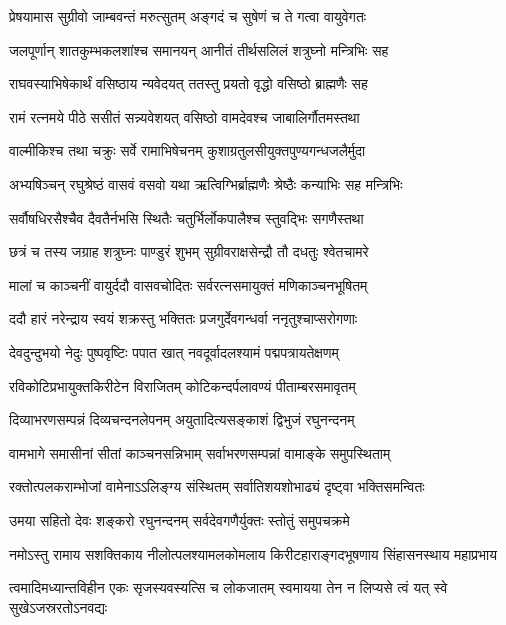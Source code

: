 \twolineshloka
{प्रेषयामास सुग्रीवो जाम्बवन्तं मरुत्सुतम्}
{अङ्गदं च सुषेणं च ते गत्वा वायुवेगतः} %

\twolineshloka
{जलपूर्णान् शातकुम्भकलशांश्च समानयन्}
{आनीतं तीर्थसलिलं शत्रुघ्नो मन्त्रिभिः सह} %

\twolineshloka
{राघवस्याभिषेकार्थं वसिष्ठाय न्यवेदयत्}
{ततस्तु प्रयतो वृद्धो वसिष्ठो ब्राह्मणैः सह} %

\twolineshloka
{रामं रत्नमये पीठे ससीतं सन्न्यवेशयत्}
{वसिष्ठो वामदेवश्च जाबालिर्गौतमस्तथा} %

\twolineshloka
{वाल्मीकिश्च तथा चक्रुः सर्वे रामाभिषेचनम्}
{कुशाग्रतुलसीयुक्तपुण्यगन्धजलैर्मुदा} %

\twolineshloka
{अभ्यषिञ्चन् रघुश्रेष्ठं वासवं वसवो यथा}
{ऋत्विग्भिर्ब्राह्मणैः श्रेष्ठैः कन्याभिः सह मन्त्रिभिः} %

\twolineshloka
{सर्वौषधिरसैश्चैव दैवतैर्नभसि स्थितैः}
{चतुर्भिर्लोकपालैश्च स्तुवद्भिः सगणैस्तथा} %

\twolineshloka
{छत्रं च तस्य जग्राह शत्रुघ्नः पाण्डुरं शुभम्}
{सुग्रीवराक्षसेन्द्रौ तौ दधतुः श्वेतचामरे} %

\twolineshloka
{मालां च काञ्चनीं वायुर्ददौ वासवचोदितः}
{सर्वरत्नसमायुक्तं मणिकाञ्चनभूषितम्} %

\twolineshloka
{ददौ हारं नरेन्द्राय स्वयं शक्रस्तु भक्तितः}
{प्रजगुर्देवगन्धर्वा ननृतुश्चाप्सरोगणाः} %

\twolineshloka
{देवदुन्दुभयो नेदुः पुष्पवृष्टिः पपात खात्}
{नवदूर्वादलश्यामं पद्मपत्रायतेक्षणम्} %

\twolineshloka
{रविकोटिप्रभायुक्तकिरीटेन विराजितम्}
{कोटिकन्दर्पलावण्यं पीताम्बरसमावृतम्} %

\twolineshloka
{दिव्याभरणसम्पन्नं दिव्यचन्दनलेपनम्}
{अयुतादित्यसङ्काशं द्विभुजं रघुनन्दनम्} %

\twolineshloka
{वामभागे समासीनां सीतां काञ्चनसन्निभाम्}
{सर्वाभरणसम्पन्नां वामाङ्के समुपस्थिताम्} %

\twolineshloka
{रक्तोत्पलकराम्भोजां वामेनाऽऽलिङ्ग्य संस्थितम्}
{सर्वातिशयशोभाढ्यं दृष्ट्वा भक्तिसमन्वितः} %

\twolineshloka
{उमया सहितो देवः शङ्करो रघुनन्दनम्}
{सर्वदेवगणैर्युक्तः स्तोतुं समुपचक्रमे} %


\fourlineindentedshloka
{नमोऽस्तु रामाय सशक्तिकाय}
{नीलोत्पलश्यामलकोमलाय}
{किरीटहाराङ्गदभूषणाय}
{सिंहासनस्थाय महाप्रभाय} %

\fourlineindentedshloka
{त्वमादिमध्यान्तविहीन एकः}
{सृजस्यवस्यत्सि च लोकजातम्}
{स्वमायया तेन न लिप्यसे त्वं}
{यत् स्वे सुखेऽजस्ररतोऽनवद्यः} %

